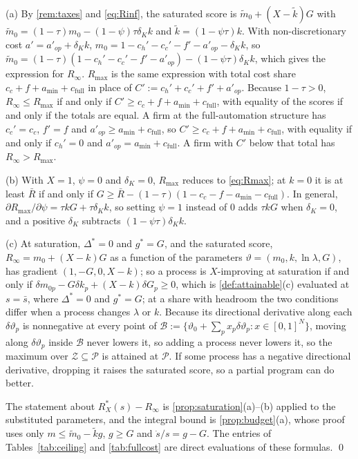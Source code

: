 (a) By \autoref{rem:taxes} and \eqref{eq:Rinf}, the saturated score is $\tilde m_0+(X-\tilde k)G$ with $\tilde m_0=(1-\tau)m_0-(1-\psi)\tau\delta_Kk$ and $\tilde k=(1-\psi\tau)k$. With non-discretionary cost $a'=a'_{op}+\delta_Kk$, $m_0=1-c_h'-c_c'-f'-a'_{op}-\delta_Kk$, so $\tilde m_0=(1-\tau)(1-c_h'-c_c'-f'-a'_{op})-(1-\psi\tau)\delta_Kk$, which gives the expression for $R_\infty$. $R_{\max}$ is the same expression with total cost share $c_c+f+a_{\min}+c_{\mathrm{full}}$ in place of $C':=c_h'+c_c'+f'+a'_{op}$. Because $1-\tau>0$, $R_\infty\le R_{\max}$ if and only if $C'\ge c_c+f+a_{\min}+c_{\mathrm{full}}$, with equality of the scores if and only if the totals are equal. A firm at the full-automation structure has $c_c'=c_c$, $f'=f$ and $a'_{op}\ge a_{\min}+c_{\mathrm{full}}$, so $C'\ge c_c+f+a_{\min}+c_{\mathrm{full}}$, with equality if and only if $c_h'=0$ and $a'_{op}=a_{\min}+c_{\mathrm{full}}$. A firm with $C'$ below that total has $R_\infty>R_{\max}$.

(b) With $X=1$, $\psi=0$ and $\delta_K=0$, $R_{\max}$ reduces to \eqref{eq:Rmax}; at $k=0$ it is at least $\bar R$ if and only if $G\ge\bar R-(1-\tau)(1-c_c-f-a_{\min}-c_{\mathrm{full}})$. In general, $\partial R_{\max}/\partial\psi=\tau kG+\tau\delta_Kk$, so setting $\psi=1$ instead of $0$ adds $\tau kG$ when $\delta_K=0$, and a positive $\delta_K$ subtracts $(1-\psi\tau)\delta_Kk$.

(c) At saturation, $\Delta^*=0$ and $g^*=G$, and the saturated score, $R_\infty=m_0+(X-k)G$ as a function of the parameters $\vartheta=(m_0,k,\ln\lambda,G)$, has gradient $(1,-G,0,X-k)$; so a process is $X$-improving at saturation if and only if $\delta m_{0p}-G\delta k_p+(X-k)\delta G_p\ge0$, which is \autoref{def:attainable}(c) evaluated at $s=\bar s$, where $\Delta^*=0$ and $g^*=G$; at a share with headroom the two conditions differ when a process changes $\lambda$ or $k$. Because its directional derivative along each $\delta\vartheta_p$ is nonnegative at every point of $\mathcal B:=\{\vartheta_0+\sum_px_p\delta\vartheta_p:x\in[0,1]^N\}$, moving along $\delta\vartheta_p$ inside $\mathcal B$ never lowers it, so adding a process never lowers it, so the maximum over $\mathcal Z\subseteq\mathcal P$ is attained at $\mathcal P$. If some process has a negative directional derivative, dropping it raises the saturated score, so a partial program can do better.

The statement about $R_X^*(s)-R_\infty$ is \autoref{prop:saturation}(a)--(b) applied to the substituted parameters, and the integral bound is \autoref{prop:budget}(a), whose proof uses only $m\le\tilde m_0-\tilde kg$, $g\ge G$ and $\dot s/s=g-G$. The entries of Tables~\ref{tab:ceiling} and \ref{tab:fullcost} are direct evaluations of these formulas. \qed

